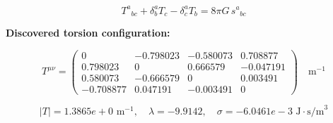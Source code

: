 
\begin{equation}
  T^a{}_{bc} + \delta^a_b T_c - \delta^a_c T_b = 8\pi G \, s^a{}_{bc}
\end{equation}

\textbf{Discovered torsion configuration:}

\begin{equation}
  T^{\mu\nu} = \begin{pmatrix}
    0 & -0.798023 & -0.580073 & 0.708877 \\
    0.798023 & 0 & 0.666579 & -0.047191 \\
    0.580073 & -0.666579 & 0 & 0.003491 \\
    -0.708877 & 0.047191 & -0.003491 & 0
  \end{pmatrix} \quad \text{m}^{-1}
\end{equation}

\begin{equation}
  |T| = 1.3865e+0 \text{ m}^{-1}, \quad
  \lambda = -9.9142, \quad
  \sigma = -6.0461e-3 \text{ J}\cdot\text{s/m}^3
\end{equation}